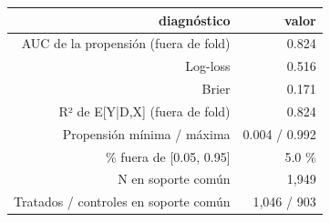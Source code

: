 \begin{tabular}{rr}
\toprule
diagnóstico & valor \\
\midrule
AUC de la propensión (fuera de fold) & 0.824 \\
Log-loss & 0.516 \\
Brier & 0.171 \\
R² de E[Y|D,X] (fuera de fold) & 0.824 \\
Propensión mínima / máxima & 0.004 / 0.992 \\
\% fuera de [0.05, 0.95] & 5.0 \% \\
N en soporte común & 1,949 \\
Tratados / controles en soporte común & 1,046 / 903 \\
\bottomrule
\end{tabular}